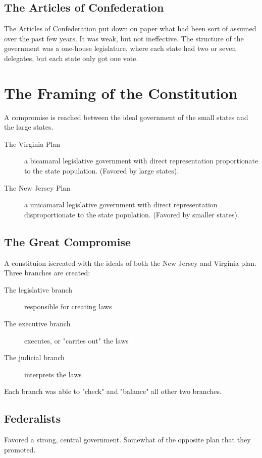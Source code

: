 \subsection{The Articles of Confederation}
The Articles of Confederation put down on paper what had been sort of assumed
over the past few years.  It was weak, but not ineffective.  The structure of
the government was a one-house legislature, where each state had two or seven
delegates, but each state only got one vote.

\section{The Framing of the Constitution}
A compromise is reached between the ideal government of the small states and the
large states.

\begin{description}
  \item[The Virginia Plan] a bicamaral legislative government with direct
    representation proportionate to the state population.  (Favored by large
    states).
  \item[The New Jersey Plan] a unicamaral legislative government with direct
    representation disproportionate to the state population.  (Favored by
    smaller states).
\end{description}

\subsection{The Great Compromise}
A constituion iscreated with the ideals of both the New Jersey and Virginia
plan.  Three branches are created:

\begin{description}
  \item[The legislative branch] responsible for creating laws
  \item[The executive branch] executes, or "carries out" the laws
  \item[The judicial branch] interprets the laws
\end{description}

Each branch was able to "check" and "balance" all other two branches.

\subsection{Federalists}
Favored a strong, central government.  Somewhat of the opposite plan that they
promoted.


